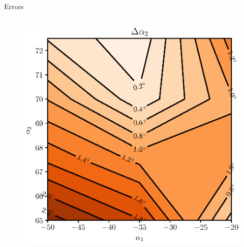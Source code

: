 \begin{frame}{Errors}
\begin{columns}
\begin{figure}
            \centering
            \includegraphics[scale=0.5]{./images/angleError.eps}
        \end{figure}
    \end{columns}
\end{frame}

